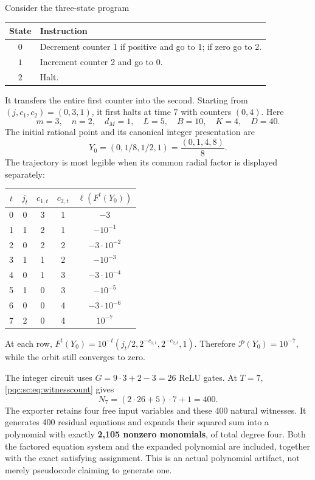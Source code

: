 \documentclass[11pt,letterpaper]{article}
\numberwithin{equation}{section}
\theoremstyle{definition}
\theoremstyle{remark}
\newcommand{\Peak}{\mathcal P}
\begin{document}
Consider the three-state program
\begin{center}
\begin{tabular}{cl}
\toprule
State & Instruction \\\midrule
$0$ & Decrement counter 1 if positive and go to 1; if zero go to 2.\\
$1$ & Increment counter 2 and go to 0.\\
$2$ & Halt.\\
\bottomrule
\end{tabular}
\end{center}
It transfers the entire first counter into the second. Starting from
$(j,c_1,c_2)=(0,3,1)$, it first halts at time $7$ with counters $(0,4)$.
Here
\[
 m=3,\quad n=2,\quad d_M=1,\quad L=5,\quad B=10,\quad K=4,\quad D=40.
\]
The initial rational point and its canonical integer presentation are
\[
 Y_0=(0,1/8,1/2,1)=\frac{(0,1,4,8)}8.
\]
The trajectory is most legible when its common radial factor is displayed
separately:
\begin{center}
\begin{tabular}{ccccc}
\toprule
$t$ & $j_t$ & $c_{1,t}$ & $c_{2,t}$ & $\ell(F^t(Y_0))$ \\\midrule
0&0&3&1&$-3$\\
1&1&2&1&$-10^{-1}$\\
2&0&2&2&$-3\cdot10^{-2}$\\
3&1&1&2&$-10^{-3}$\\
4&0&1&3&$-3\cdot10^{-4}$\\
5&1&0&3&$-10^{-5}$\\
6&0&0&4&$-3\cdot10^{-6}$\\
7&2&0&4&$10^{-7}$\\
\bottomrule
\end{tabular}
\end{center}
At each row,
$F^t(Y_0)=10^{-t}(j_t/2,2^{-c_{1,t}},2^{-c_{2,t}},1)$.
Therefore $\Peak(Y_0)=10^{-7}$, while the orbit still converges to zero.

The integer circuit uses $G=9\cdot3+2-3=26$ ReLU gates. At $T=7$,
\eqref{pqc:sc:eq:witnesscount} gives
\[
 N_7=(2\cdot26+5)\cdot7+1=400.
\]
The exporter retains four free input variables and these 400 natural
witnesses. It generates 400 residual equations and expands their squared
sum into a polynomial with exactly \textbf{2,105 nonzero monomials}, of total
degree four. Both the factored equation system and the expanded polynomial
are included, together with the exact satisfying assignment. This is an
actual polynomial artifact, not merely pseudocode claiming to generate one.
\end{document}

